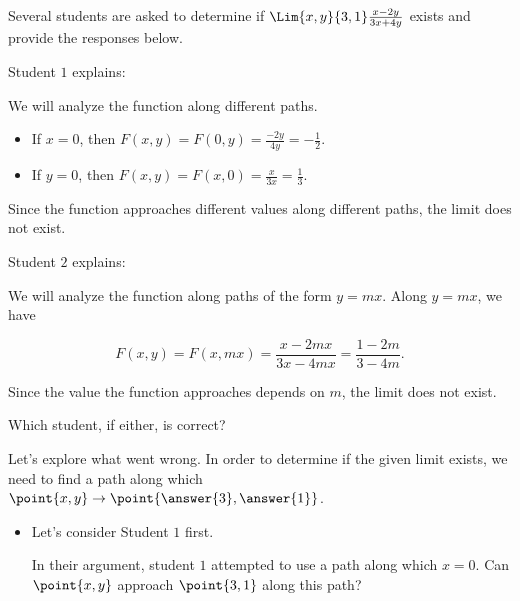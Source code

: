 \documentclass{ximera}
\author{Jim Talamo}
\begin{document}
\begin{exercise}

Several students are asked to determine if $\Lim{x,y}{3,1} \frac{x-2y}{3x+4y}$ exists and provide the responses below.

Student $1$ explains:

\begin{explanation}
We will analyze the function along different paths.

\begin{itemize}
\item If $x=0$, then $F(x,y) = F(0,y) = \frac{-2y}{4y} = -\frac{1}{2}$.
\item If $y=0$, then $F(x,y) = F(x,0) = \frac{x}{3x} = \frac{1}{3}$.
\end{itemize}

Since the function approaches different values along different paths, the limit does not exist.
\end{explanation}

Student $2$ explains:

\begin{explanation}
We will analyze the function along paths of the form $y=mx$.  Along $y=mx$, we have

\[
F(x,y)=F(x,mx) = \frac{x-2mx}{3x-4mx} = \frac{1-2m}{3-4m}.
\]

Since the value the function approaches depends on $m$, the limit does not exist.
\end{explanation}

Which student, if either, is correct?

\begin{multipleChoice}
\end{multipleChoice}

\begin{exercise}
Let's explore what went wrong.  In order to determine if the given limit exists, we need to find a path along which $\point{x,y} \to \point{\answer{3},\answer{1}}$.

\begin{itemize}
\item Let's consider Student $1$ first.

In their argument, student $1$ attempted to use a path along which $x=0$.  Can $\point{x,y}$ approach $\point{3,1}$ along this path? 


\end{itemize}
\end{exercise}
\end{exercise}
\end{document}

